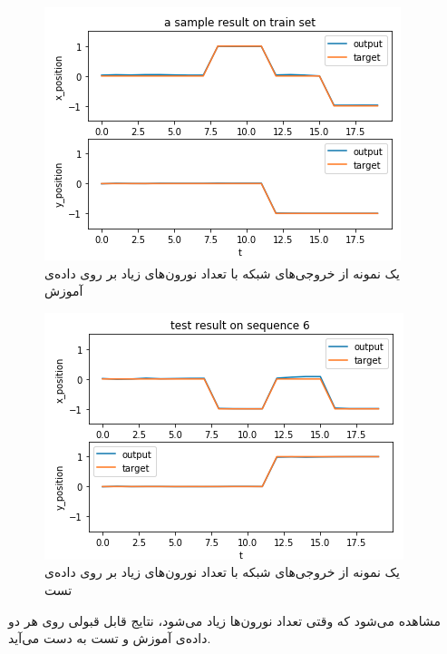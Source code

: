 \documentclass[a4paper]{article}
\begin{document}
\begin{itemize}
		\begin{figure}[h!]
		\centering
		\includegraphics[scale=0.7]{fig16.png}
		\caption{یک نمونه از خروجی‌های شبکه با تعداد نورون‌های زیاد بر روی داده‌ی آموزش}
		\label{fig16}
	\end{figure}
	
		\begin{figure}[h!]
		\centering
		\includegraphics[scale=0.7]{fig17.png}
		\caption{یک نمونه از خروجی‌های شبکه با تعداد نورون‌های زیاد بر روی داده‌ی تست}
		\label{fig17}
	\end{figure}
مشاهده می‌شود که وقتی تعداد نورون‌ها زیاد می‌شود، نتایج قابل قبولی روی هر دو داده‌ی آموزش و تست به دست می‌آید.



\end{itemize}
\end{document}

